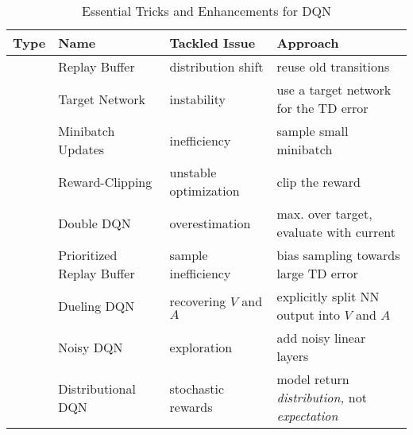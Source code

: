 	\begin{table}
		\centering
		\begin{tabular}{c|lll}
			\toprule
			\textbf{Type}                                        & \textbf{Name}             & \textbf{Tackled Issue}     & \textbf{Approach}                                        \\ \midrule
			\multirowcell{4}{\rotatebox{90}{\textbf{Essential}}} & Replay Buffer             & distribution shift         & reuse old transitions                                    \\
			                                                     & Target Network            & instability                & use a target network for the \acs{TD} error              \\
			                                                     & Minibatch Updates         & inefficiency               & sample small minibatch                                   \\
			                                                     & Reward-Clipping           & unstable optimization      & clip the reward                                          \\ \midrule
			\multirowcell{5}{\rotatebox{90}{\textbf{Enhance.}}}  & Double \acs{DQN}          & overestimation             & max. over target, evaluate with current                  \\
			                                                     & Prioritized Replay Buffer & sample inefficiency        & bias sampling towards large \acs{TD} error               \\
			                                                     & Dueling \acs{DQN}         & recovering \(V\) and \(A\) & explicitly split \acs{NN} output into \(V\) and \(A\)    \\
			                                                     & Noisy \acs{DQN}           & exploration                & add noisy linear layers                                  \\
			                                                     & Distributional \acs{DQN}  & stochastic rewards         & model return \emph{distribution,} not \emph{expectation} \\ \bottomrule
		\end{tabular}
		\caption{Essential Tricks and Enhancements for \acs{DQN}}
		\label{tab:dqnHacks}
	\end{table}

